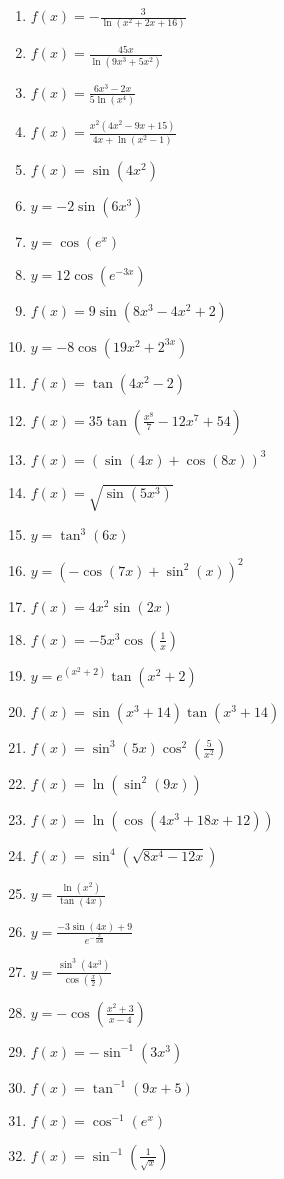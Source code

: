 \documentclass[a4paper,10pt]{article}
\begin{document}
\begin{multicols}{3}
\begin{enumerate}
\item $f(x) = -\frac{3}{\ln(x^2 + 2x + 16)}$
\item $f(x) = \frac{45x}{\ln(9x^3 + 5x^2)}$
\item $f(x) = \frac{6x^3 - 2x}{5\ln(x^4)}$
\item $f(x) = \frac{x^2(4x^2 - 9x + 15)}{4x + \ln(x^2 - 1)}$

\item $f(x) = \sin(4x^2)$
\item $y = -2\sin(6x^3)$
\item $y = \cos(e^x)$
\item $y = 12\cos(e^{-3x})$

\item $f(x) = 9\sin(8x^3 - 4x^2 + 2) $
\item $y = -8\cos(19x^2 + 2^{3x})$
\item $f(x) = \tan(4x^2 - 2)$
\item $f(x) = 35\tan\left(\frac{x^8}{7} - 12x^7 + 54\right)$

\item $f(x) = (\sin(4x) + \cos(8x))^3$
\item $f(x) = \sqrt{\sin(5x^3)}$
\item $y = \tan^3(6x)$
\item $y = (-\cos(7x) + \sin^2(x))^2$

\item $f(x) = 4x^2\sin(2x)$
\item $f(x) = -5x^3\cos\left(\frac{1}{x}\right)$
\item $y = e^{(x^2 + 2)}\tan(x^2 + 2)$
\item $f(x) = \sin(x^3 + 14)\tan(x^3 + 14)$

\item $f(x) = \sin^3(5x)\cos^2\left(\frac{5}{x^2}\right)$
\item $f(x) = \ln(\sin^2(9x))$
\item $f(x) = \ln(\cos(4x^3 + 18x + 12))$
\item $f(x) = \sin^4(\sqrt{8x^4 - 12x})$

\item $y = \frac{\ln(x^2)}{\tan(4x)}$
\item $y = \frac{-3\sin(4x) + 9}{e^{-\frac{x}{100}}}$
\item $y = \frac{\sin^3(4x^3)}{\cos\left(\frac{x}{2}\right)}$
\item $y = -\cos\left(\frac{x^2 + 3}{x - 4}\right)$

\item $f(x) = -\sin^{-1}(3x^3)$
\item $f(x) = \tan^{-1}(9x + 5)$
\item $f(x) = \cos^{-1}(e^x)$
\item $f(x) = \sin^{-1}\left(\frac{1}{\sqrt{x}}\right)$


\end{enumerate}
\end{multicols}
\end{document}
